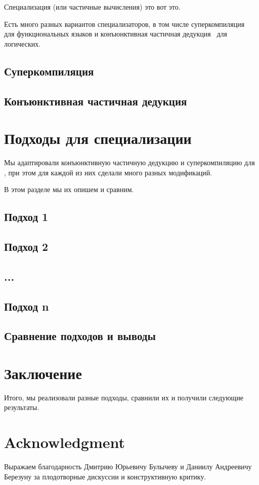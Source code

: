 \documentclass[conference]{IEEEtran}
\begin{document}
Специализация (или частичные вычисления) это вот это.~\cite{jones1993partial}

Есть много разных вариантов специализаторов, в том числе суперкомпиляция~\cite{soerensen1996positive} для функциональных языков и конъюнктивная частичная дедукция~\cite{de1999conjunctive} для логических. 

\subsection{Суперкомпиляция}

\subsection{Конъюнктивная частичная дедукция}

\section{Подходы для специализации \miniKanren}

Мы адаптировали конъюнктивную частичную дедукцию и суперкомпиляцию для \miniKanren, при этом для каждой из них сделали много разных модификаций. 

В этом разделе мы их опишем и сравним. 


\subsection{Подход 1}

\subsection{Подход 2}

\subsection{...}

\subsection{Подход n}

\subsection{Сравнение подходов и выводы}


\section{Заключение}

Итого, мы реализовали разные подходы, сравнили их и получили следующие результаты. 


\section*{Acknowledgment}

Выражаем благодарность Дмитрию Юрьевичу Булычеву и Даниилу Андреевичу Березуну за плодотворные дискуссии и конструктивную критику.
 



\end{document}
